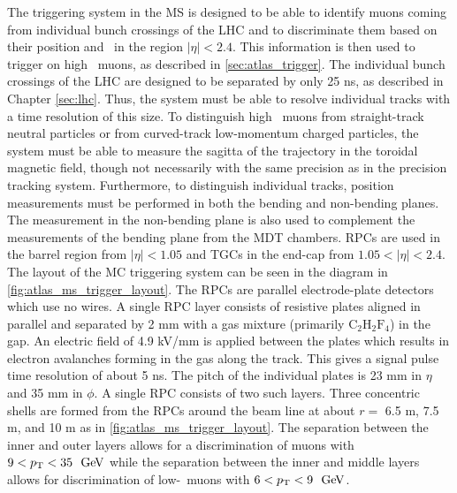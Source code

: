 The triggering system in the MS is designed to be able
to identify muons coming from individual bunch crossings of the LHC
and to discriminate them based on their position and \pt~in the region
$|\eta|<2.4$. This information
is then used to trigger on high \pt~muons, as 
described in \sec\ref{sec:atlas_trigger}.
The individual bunch crossings of the LHC are designed to 
be separated by only 25 ns, as described in Chapter \ref{sec:lhc}.
Thus, the system must be able to resolve individual tracks 
with a time resolution of this size.
To distinguish high \pt~muons from straight-track neutral particles 
or from curved-track low-momentum charged particles, the 
system must be able to measure the sagitta of the 
trajectory in the toroidal magnetic field, though not necessarily
with the same precision as in the precision tracking system.
Furthermore, to distinguish individual tracks, position measurements
must be performed in both the bending and non-bending planes.
The measurement in the non-bending plane is also used to complement
the measurements of the bending plane from the MDT chambers.
RPCs are used in the barrel region
from $|\eta|<1.05$ and TGCs in the end-cap from $1.05 < |\eta|<2.4$.
The layout of the MC triggering system can be seen in the diagram
in \fig\ref{fig:atlas_ms_trigger_layout}. 
The RPCs are parallel electrode-plate detectors which use no wires.
A single RPC layer consists of 
resistive plates aligned in parallel and separated by 2 mm 
with a gas mixture (primarily $\textrm{C}_2\textrm{H}_2\textrm{F}_4$)
in the gap. An electric field of 4.9 kV/mm is applied between 
the plates which results in electron avalanches forming in the gas
along the track.
This gives a signal pulse time resolution of about 5 ns.
The pitch of the individual plates is 23 mm in $\eta$ and 35 mm in $\phi$.
A single RPC consists of two such layers.  Three concentric shells 
are formed from the RPCs around the beam line 
at about $r = $ 6.5 m, 7.5 m, and 10 m
as in \fig\ref{fig:atlas_ms_trigger_layout}.
The separation between the inner and outer layers 
allows for a discrimination of muons with $9 < \pt < 35~\GeV$
while the separation between the inner and middle layers allows for 
discrimination of low-\pt~muons with $6 < \pt < 9~\GeV$.


